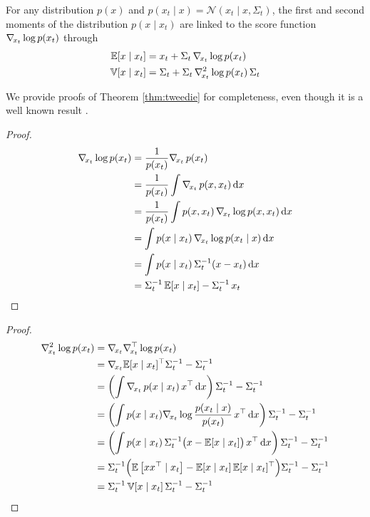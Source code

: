 \begin{subappendices}
\begin{theorem} \label{thm:tweedie}
    For any distribution $p(x)$ and $p(x_t \mid x) = \mathcal{N}(x_t \mid x, \Sigma_t)$, the first and second moments of the distribution $p(x \mid x_t)$ are linked to the score function $\nabla_{\!{x_t}} \log p(x_t)$ through
    \begin{align}
        \mathbb{E} [x \mid x_t] & = x_t + \Sigma_t \, \nabla_{\!{x_t}} \log p(x_t) \\
        \mathbb{V} [x \mid x_t] & = \Sigma_t + \Sigma_t \, \nabla_{\!{x_t}}^2 \log p(x_t) \, \Sigma_t
    \end{align}
\end{theorem}

We provide proofs of Theorem \ref{thm:tweedie} for completeness, even though it is a well known result \cite{tweedie1947functions, efron2011tweedies, kim2021noise2score, meng2021estimating}.

\begin{proof}
    \begin{align*}
        \grad{x_t} \log p(x_t) & = \frac{1}{p(x_t)} \grad{x_t} \, p(x_t) \\
        & = \frac{1}{p(x_t)} \int \grad{x_t} \, p(x, x_t) \d{x} \\
        & = \frac{1}{p(x_t)} \int p(x, x_t) \, \grad{x_t} \log p(x, x_t) \d{x} \\
        & = \int p(x \mid x_t) \, \grad{x_t} \log p(x_t \mid x) \d{x} \\
        & = \int p(x \mid x_t) \, \Sigma_t^{-1} (x - x_t) \d{x} \\
        & = \Sigma_t^{-1} \, \mathbb{E} [x \mid x_t] - \Sigma_t^{-1} \, x_t \qedhere
    \end{align*}
\end{proof}
\begin{proof}
    \begin{align*}
        \grad{x_t}^2 \log p(x_t) & = \grad{x_t} \grad{x_t}^\top \log p(x_t) \\
        & = \grad{x_t} \mathbb{E} [x \mid x_t]^\top \Sigma_t^{-1} - \Sigma_t^{-1} \\
        & = \left( \int \grad{x_t} \, p(x \mid x_t) \, x^\top \d{x} \right) \Sigma_t^{-1} - \Sigma_t^{-1} \\
        & = \left( \int p(x \mid x_t) \grad{x_t} \log \frac{p(x_t \mid x)}{p(x_t)} \, x^\top \d{x} \right) \Sigma_t^{-1} - \Sigma_t^{-1} \\
        & = \left( \int p(x \mid x_t) \, \Sigma_t^{-1} \big(x - \mathbb{E} [x \mid x_t] \big) \, x^\top \d{x} \right) \Sigma_t^{-1} - \Sigma_t^{-1} \\
        & = \Sigma_t^{-1} \Big( \mathbb{E} \left[ x x^\top \mid x_t \right] - \mathbb{E} [x \mid x_t] \, \mathbb{E} [x \mid x_t]^\top \Big) \Sigma_t^{-1} - \Sigma_t^{-1} \\
        & = \Sigma_t^{-1} \, \mathbb{V} [ x \mid x_t ] \, \Sigma_t^{-1} - \Sigma_t^{-1} \qedhere
    \end{align*}
\end{proof}


\end{subappendices}
